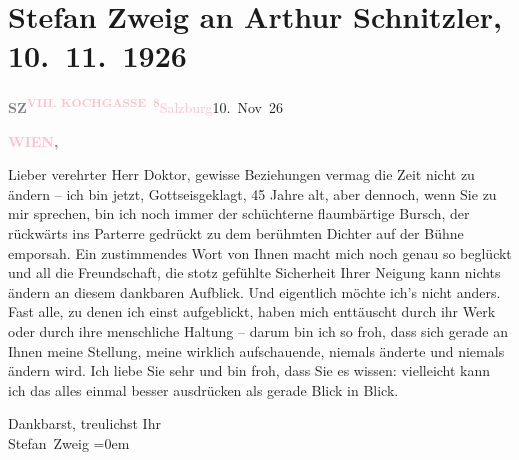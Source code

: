 

\renewcommand{\erwaehntePersonen}{Personen: Stefan Zweig}
\renewcommand{\erwaehnteOrte}{Orte: Kochgasse 8, Salzburg, Wien}
\renewcommand{\erwaehnteWerke}{}
\section[Stefan Zweig an Arthur Schnitzler, 10. 11. 1926]{Stefan Zweig an Arthur Schnitzler, 10. 11. 1926}
\nopagebreak{}
\rehead{ }\normalsize\beginnumbering{}
\toendnotes[C]{\smallbreak\pagebreak[2]}
\pstart
           {\pb}\textcolor{gray}{\textbf{SZ}}\hfill \substVorne{}\textsuperscript{\textcolor{gray}{\textbf{\textcolor{pink}{VIII.
                              KOCHGASSE 8}{}\ledrightnote{\textcolor{pink}{Kochgasse 8}}}}}{\allowbreak}\substDazwischen{}\textcolor{pink}{Salzburg}{}\ledrightnote{\textcolor{pink}{Salzburg}}{ }10. Nov 26\substHinten{}\pend
           
\pstart
           \raggedleft{}\textcolor{gray}{\textbf{\textcolor{pink}{WIEN}{}\ledrightnote{\textcolor{pink}{Wien}},}}\pend
           
\pstart
           Lieber verehrter Herr Doktor, gewisse Beziehungen vermag die Zeit
               nicht zu ändern – ich bin jetzt, Gottseisgeklagt, 45 Jahre alt, aber dennoch, wenn
               Sie zu mir sprechen, bin ich noch immer der schüchterne flaumbärtige Bursch, der
               rückwärts ins Parterre gedrückt  zu dem berühmten
               Dichter auf der Bühne \introOben{}empor\introOben{}sah. Ein zustimmendes Wort von
               Ihnen macht mich noch genau so beglückt und all die Freundschaft, die stotz gefühlte
                  {\pb}Sicherheit Ihrer Neigung kann nichts
               ändern an diesem dankbaren Aufblick. Und eigentlich möchte ich’s nicht anders. Fast
               alle, zu denen ich einst aufgeblickt, haben mich enttäuscht durch ihr Werk oder durch
               ihre menschliche Haltung – darum bin ich so froh, dass sich gerade an Ihnen meine
               Stellung, meine wirklich aufschauende, niemals änderte und niemals ändern wird. Ich
               liebe Sie sehr und bin froh, dass Sie es wissen: vielleicht kann ich das alles einmal
               besser ausdrücken als gerade Blick in Blick.\pend
           
\pstart
           Dankbarst, treulichst Ihr{\\[\baselineskip]}\spacefill\mbox{Stefan Zweig}\pend
           \leftskip=0em{}\endnumbering{}
\begin{anhang}
\end{anhang}
      